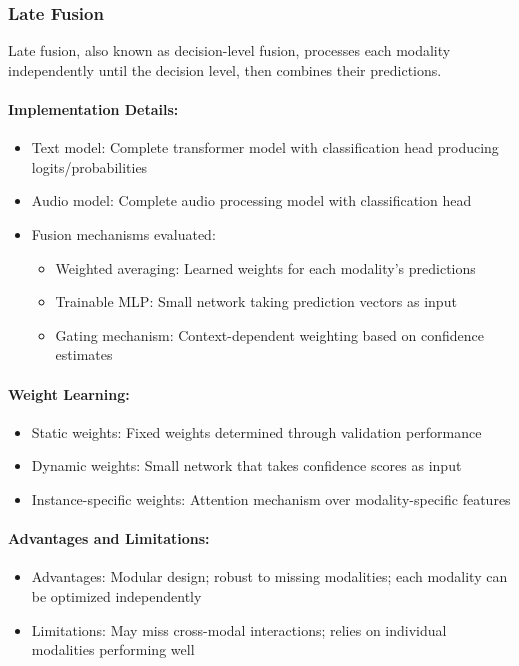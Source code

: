 \documentclass[12pt]{article}
\begin{document}
\subsubsection{Late Fusion}
Late fusion, also known as decision-level fusion, processes each modality independently until the decision level, then combines their predictions.

\paragraph{Implementation Details:}
\begin{itemize}
    \item Text model: Complete transformer model with classification head producing logits/probabilities
    \item Audio model: Complete audio processing model with classification head
    \item Fusion mechanisms evaluated:
    \begin{itemize}
        \item Weighted averaging: Learned weights for each modality's predictions
        \item Trainable MLP: Small network taking prediction vectors as input
        \item Gating mechanism: Context-dependent weighting based on confidence estimates
    \end{itemize}
\end{itemize}

\paragraph{Weight Learning:}
\begin{itemize}
    \item Static weights: Fixed weights determined through validation performance
    \item Dynamic weights: Small network that takes confidence scores as input
    \item Instance-specific weights: Attention mechanism over modality-specific features
\end{itemize}

\paragraph{Advantages and Limitations:}
\begin{itemize}
    \item Advantages: Modular design; robust to missing modalities; each modality can be optimized independently
    \item Limitations: May miss cross-modal interactions; relies on individual modalities performing well
\end{itemize}
\end{document}
